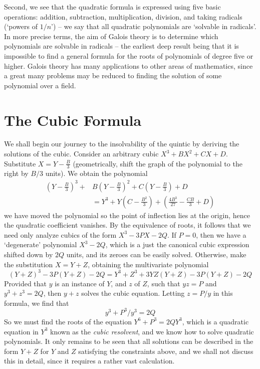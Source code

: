 Second, we see that the quadratic formula is expressed using five basic operations: addition, subtraction, multiplication, division, and taking radicals (`powers of $1/n$') -- we say that all quadratic polynomials are `solvable in radicals'. In more precise terms, the aim of Galois theory is to determine which polynomials are solvable in radicals -- the earliest deep result being that it is impossible to find a general formula for the roots of polynomials of degree five or higher. Galois theory has many applications to other areas of mathematics, since a great many problems may be reduced to finding the solution of some polynomial over a field.

\section{The Cubic Formula}

We shall begin our journey to the insolvability of the quintic by deriving the solutions of the cubic. Consider an arbitrary cubic $X^3 + BX^2 + CX + D$. Substitute $X = Y - \frac{B}{3}$ (geometrically, shift the graph of the polynomial to the right by $B/3$ units). We obtain the polynomial
%
\begin{align*}
    \left(Y - \frac{B}{3}\right)^3 + &B\left(Y - \frac{B}{3}\right)^2 + C\left(Y - \frac{B}{3}\right) + D\\
    &= Y^3 + Y\left(C - \frac{B^2}{3}\right) + \left( \frac{4B^3}{27} - \frac{CB}{3} + D \right)
\end{align*}
%
we have moved the polynomial so the point of inflection lies at the origin, hence the quadratic coefficient vanishes. By the equivalence of roots, it follows that we need only analyze cubics of the form $X^3 - 3PX - 2Q$. If $P = 0$, then we have a `degenerate' polynomial $X^3 - 2Q$, which is a just the canonical cubic expression shifted down by $2Q$ units, and its zeroes can be easily solved. Otherwise, make the substitution $X = Y + Z$, obtaining the multivariate polynomial
%
\[ (Y + Z)^3 - 3P(Y + Z) - 2Q = Y^3 + Z^3 + 3YZ(Y + Z) - 3P(Y + Z) - 2Q \]
%
Provided that $y$ is an instance of $Y$, and $z$ of $Z$, such that $yz = P$ and $y^3 + z^3 = 2Q$, then $y + z$ solves the cubic equation. Letting $z = P/y$ in this formula, we find that
%
\[ y^3 + P^3/y^3 = 2Q \]
%
So we must find the roots of the equation $Y^6 + P^3 = 2QY^3$, which is a quadratic equation in $Y^3$ known as the {\it cubic resolvent}, and we know how to solve quadratic polynomials. It only remains to be seen that all solutions can be described in the form $Y + Z$ for $Y$ and $Z$ satisfying the constraints above, and we shall not discuss this in detail, since it requires a rather vast calculation.

